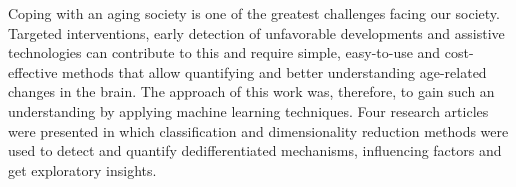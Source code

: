 Coping with an aging society is one of the greatest challenges facing our society. Targeted interventions, early detection of unfavorable developments and assistive technologies can contribute to this and require simple, easy-to-use and cost-effective methods that allow quantifying and better understanding age-related changes in the brain.  The approach of this work was, therefore, to gain such an understanding by applying machine learning techniques. Four research articles were presented in which classification and dimensionality reduction methods were used to detect and quantify dedifferentiated mechanisms, influencing factors and get exploratory insights. 

